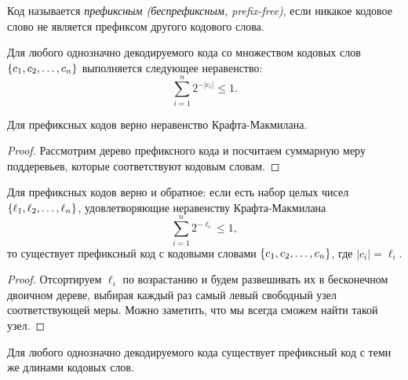 \documentclass[12pt]{article}
\begin{document}
\begin{definition}
    Код называется \emph{префиксным (беспрефиксным, prefix-free)}, если никакое
    кодовое слово не является префиксом другого кодового слова.
\end{definition}

\begin{theorem}\label{thm:mcmill}
    Для любого однозначно декодируемого кода со множеством кодовых слов 
    \(\{{c}_1,{c}_2,\dotsc,{c}_{n}\}\) выполняется следующее неравенство:
    \[
        \sum_{i=1}^{n} 2^{-|c_i|} \le 1.
    \]
\end{theorem}
\begin{lemma}
    Для префиксных кодов верно неравенство Крафта-Макмилана.
\end{lemma}
\begin{proof}
    Рассмотрим дерево префиксного кода и посчитаем суммарную меру поддеревьев,
    которые соответствуют кодовым словам.
\end{proof}

\begin{statement}
    Для префиксных кодов верно и обратное: если есть набор целых чисел
    \(\{{\ell}_1,{\ell}_2,\dotsc,{\ell}_{n}\}\),
    удовлетворяющие неравенству Крафта-Макмилана
    \[
        \sum_{i=1}^{n} 2^{-\ell_i} \le 1,
    \]
    то существует префиксный код с кодовыми
    словами \(\{{c}_1,{c}_2,\dotsc,{c}_{n}\}\), где \(|c_i| = \ell_i\).
\end{statement}
\begin{proof}
    Отсортируем $\ell_i$ по возрастанию и будем развешивать их в бесконечном
    двоичном дереве, выбирая каждый раз самый левый свободный узел
    соответствующей меры. Можно заметить, что мы всегда сможем найти такой узел.
\end{proof}
\begin{corollary}
    Для любого однозначно декодируемого кода существует префиксный код с теми же
    длинами кодовых слов.
\end{corollary}
\end{document}
